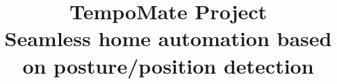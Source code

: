 \documentclass[11pt, conference]{IEEEtran}
\begin{document}
\newcommand{\addImageFull}[2]{
  \begin{figure}[ht]
    \begin{center}
      \texttt{[image: \#1]}
      \caption{#2} %
      \renewcommand{\thefigure}{\thesubsection.\arabic{figure}}
    \end{center}
  \end{figure}
}

\newcommand{\addImageSize}[3]{
  \begin{figure}[ht]
    \begin{center}
      \texttt{[image: \#2]}
      \caption{#3} %
      \renewcommand{\thefigure}{\thesubsection.\arabic{figure}}
    \end{center}
  \end{figure}
}

\setcounter{figure}{0}

\title{TempoMate Project\\
  \small{Seamless home automation based on posture/position detection\\}
}

\makeatletter
\newcommand{\linebreakand}{
  \end{@IEEEauthorhalign}
  \hfill\mbox{}\par
  \mbox{}\hfill\begin{@IEEEauthorhalign}
}
\makeatother
\end{document}
